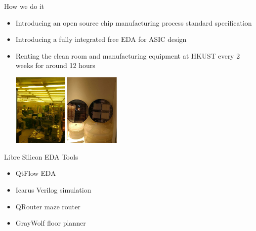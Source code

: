 \documentclass[9pt]{beamer}
\begin{document}
\begin{frame}{How we do it}
	\begin{itemize}
		\item Introducing an open source chip manufacturing process standard specification
		\item Introducing a fully integrated free EDA for ASIC design\footnotemark
		\item Renting the clean room and manufacturing equipment at HKUST every 2 weeks for around 12 hours \\		
		\begin{center}
			\includegraphics[height=100pt]{cleanroom.png}
			\includegraphics[height=100pt]{examples.png}
		\end{center}
	\end{itemize}

\end{frame}

\begin{frame}{Libre Silicon EDA Tools}
	\begin{itemize}
	        \item QtFlow EDA\footnotemark
	        \item Icarus Verilog simulation\footnotemark
	        \item QRouter maze router\footnotemark
	        \item GrayWolf floor planner\footnotemark
	\end{itemize}
\end{frame}
\end{document}
